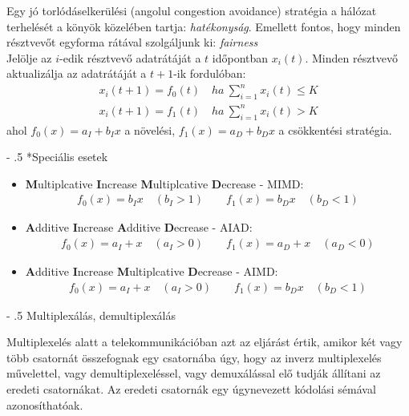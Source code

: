 \documentclass[12pt]{article}
\makeatletter
\renewcommand\paragraph{%
	\@startsection{paragraph}{4}{0mm}%
	{-\baselineskip}%
	{.5\baselineskip}%
	{\normalfont\normalsize\bfseries}}
\makeatother
\begin{document}
	\noindent Egy jó torlódáselkerülési (angolul congestion avoidance) stratégia a hálózat terhelését a könyök közelében tartja: \textit{hatékonyság}. Emellett fontos, hogy minden résztvevőt egyforma rátával szolgáljunk ki: \textit{fairness}\\

	\noindent Jelölje az $i$-edik résztvevő adatrátáját a $t$ időpontban $x_i(t)$.
	Minden résztvevő aktualizálja az adatrátáját a $t+1$-ik fordulóban:
	\begin{align*}
		x_i(t+1) = f_0(t) \quad  ha \ \sum_{i=1}^{n}x_i(t) \leq K \\
		x_i(t+1) = f_1(t) \quad  ha \ \sum_{i=1}^{n}x_i(t) > K
	\end{align*}
	ahol $f_0(x) = a_I + b_Ix$ a növelési, $f_1(x) = a_D + b_Dx$ a csökkentési stratégia.

	\paragraph*{Speciális esetek}

	\begin{itemize}
		\item \textbf{M}ultiplcative \textbf{I}ncrease \textbf{M}ultiplcative \textbf{D}ecrease - MIMD:
		\begin{align*}
			f_0(x) = b_Ix \quad (b_I > 1) \qquad
            f_1(x) = b_Dx \quad (b_D < 1)
		\end{align*}
	   \item \textbf{A}dditive \textbf{I}ncrease \textbf{A}dditive \textbf{D}ecrease - AIAD:
	   \begin{align*}
		  f_0(x) = a_I+x \quad (a_I > 0) \qquad
		  f_1(x) = a_D+x \quad (a_D < 0)        	
	   \end{align*}
	   \item \textbf{A}dditive \textbf{I}ncrease \textbf{M}ultiplcative \textbf{D}ecrease - AIMD:
	   \begin{align*}
    		f_0(x) = a_I+x \quad (a_I > 0) \qquad
            f_1(x) = b_Dx \quad (b_D < 1)
	   \end{align*}
    \end{itemize}

    \paragraph{Multiplexálás, demultiplexálás}

    Multiplexelés alatt a telekommunikációban azt az eljárást értik, amikor két vagy több csatornát összefognak egy csatornába úgy, hogy az inverz multiplexelés művelettel, vagy demultiplexeléssel, vagy demuxálással elő tudják állítani az eredeti csatornákat. Az eredeti csatornák egy úgynevezett kódolási sémával azonosíthatóak.
\end{document}
